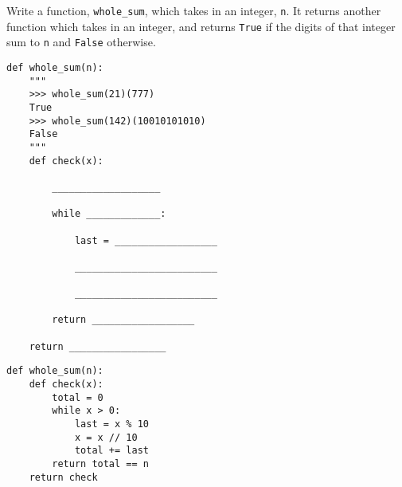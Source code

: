 \begin{blocksection}
\question Write a function, \texttt{whole\_sum}, which takes in an integer, \texttt{n}. It returns another function which takes in an integer, and returns \texttt{True} if the digits of that integer sum to \texttt{n} and \texttt{False} otherwise.

\begin{lstlisting}
def whole_sum(n): 
    """ 
    >>> whole_sum(21)(777)
    True
    >>> whole_sum(142)(10010101010)
    False
    """
    def check(x):

        ___________________
		
        while _____________:
		
            last = __________________
				
            _________________________
				
            _________________________
				
        return __________________
		
    return _________________

\end{lstlisting}

\begin{solution}
\begin{lstlisting}
def whole_sum(n):
    def check(x):
        total = 0
        while x > 0:
            last = x % 10
            x = x // 10
            total += last
        return total == n
    return check
\end{lstlisting}
\end{solution}
\end{blocksection}
